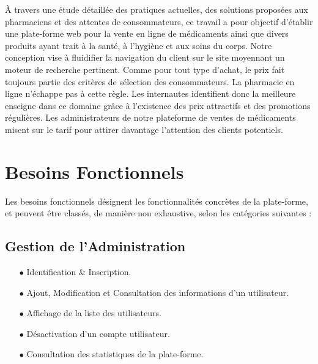 À travers une étude détaillée des pratiques actuelles, des solutions proposées aux pharmaciens et des attentes de consommateurs, ce travail a pour objectif d'établir une plate-forme web pour la vente en ligne de médicaments ainsi que divers produits ayant trait à la santé, à l'hygiène et aux soins du corps. Notre conception vise à fluidifier la navigation du client sur le site moyennant un moteur de recherche pertinent. Comme pour tout type d’achat, le prix fait toujours partie des critères de sélection des consommateurs. La pharmacie en ligne n’échappe pas à cette règle. Les internautes identifient donc la meilleure enseigne dans ce domaine grâce à l’existence des prix attractifs et des promotions régulières. Les administrateurs de notre plateforme de ventes de médicaments misent sur le tarif pour attirer davantage l’attention des clients potentiels.


\vspace{1cm}
\section{Besoins Fonctionnels}
\vspace{.5cm}

Les besoins fonctionnels désignent les fonctionnalités concrètes de la plate-forme, et peuvent être classés, de manière non exhaustive, selon les catégories suivantes :
\vspace{.3cm}
\subsection{Gestion de l'Administration}
\vspace{.3cm}
\begin{itemize}
\item[$\bullet$] Identification \& Inscription.
\item[$\bullet$] Ajout, Modification et Consultation des informations d'un utilisateur.
\item[$\bullet$] Affichage de la liste des utilisateurs.
\item[$\bullet$] Désactivation d'un compte utilisateur.
\item[$\bullet$] Consultation des statistiques de la plate-forme.
\end{itemize}
\vspace{.3cm}
